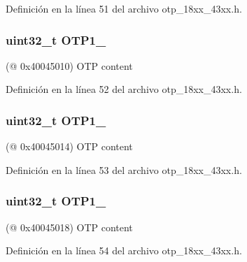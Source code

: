 Definición en la línea 51 del archivo otp\+\_\+18xx\+\_\+43xx.\+h.

\subsubsection[{\texorpdfstring{O\+T\+P1\+\_\+0}{OTP1_0}}]{ uint32\+\_\+t O\+T\+P1\+\_}\hypertarget{struct_l_p_c___o_t_p___t_afabdebf1f1f83926dab2f2b1e15661c0}{}\label{struct_l_p_c___o_t_p___t_afabdebf1f1f83926dab2f2b1e15661c0}
(@ 0x40045010) O\+TP content 

Definición en la línea 52 del archivo otp\+\_\+18xx\+\_\+43xx.\+h.

\subsubsection[{\texorpdfstring{O\+T\+P1\+\_\+1}{OTP1_1}}]{ uint32\+\_\+t O\+T\+P1\+\_}\hypertarget{struct_l_p_c___o_t_p___t_a8ebcb80290dc8278f137b023a6319420}{}\label{struct_l_p_c___o_t_p___t_a8ebcb80290dc8278f137b023a6319420}
(@ 0x40045014) O\+TP content 

Definición en la línea 53 del archivo otp\+\_\+18xx\+\_\+43xx.\+h.

\subsubsection[{\texorpdfstring{O\+T\+P1\+\_\+2}{OTP1_2}}]{ uint32\+\_\+t O\+T\+P1\+\_}\hypertarget{struct_l_p_c___o_t_p___t_a2a26be8e56a1e55f7aee987107586fe4}{}\label{struct_l_p_c___o_t_p___t_a2a26be8e56a1e55f7aee987107586fe4}
(@ 0x40045018) O\+TP content 

Definición en la línea 54 del archivo otp\+\_\+18xx\+\_\+43xx.\+h.

